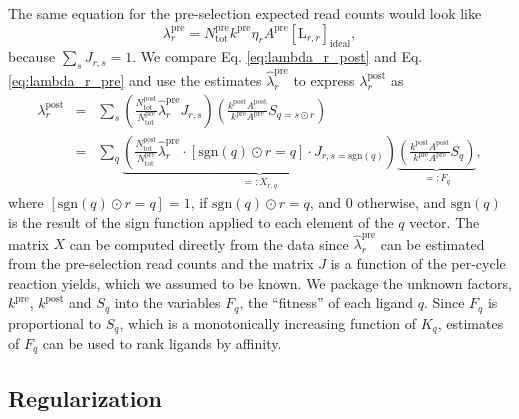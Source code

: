 \documentclass[letter,10pt,oneside]{article}
\newcommand{\bel}{\begin{equation}}
\newcommand{\eel}{\end{equation}}
\newcommand{\bal}{\begin{eqnarray}}
\newcommand{\eal}{\end{eqnarray}}
\newcommand{\+}{^\dagger}
\newcommand{\refeq}[1]{Eq. \ref{#1}}
\begin{document}
The same equation for the pre-selection expected read counts would look like
\bel
\label{eq:lambda_r_pre}
  \lambda_r^\text{pre} = N_\text{tot}^\text{pre} k^\text{pre} \eta_r A^\text{pre}[\text{L}_{r,r}]_\text{ideal},
\eel
because $\sum_s J_{r,s} = 1$. We compare \refeq{eq:lambda_r_post} and \refeq{eq:lambda_r_pre} and use the estimates $\hat \lambda_r^\text{pre}$ to express $\lambda_r^\text{post}$ as
\bal
\label{eq:lambda_post}
  \lambda_r^\text{post} &=& \sum_s \left(\frac{N_\text{tot}^\text{post}}{N_\text{tot}^\text{pre}}\hat\lambda_r^\text{pre} J_{r,s}\right) \left(\frac{k^\text{post}A^\text{post}}{k^\text{pre}A^\text{pre}} S_{q=s\odot r}\right) \\
  &=& \sum_q \underbrace{\left(\frac{N_\text{tot}^\text{post}}{N_\text{tot}^\text{pre}}\hat\lambda_r^\text{pre} \cdot [\text{sgn}(q)\odot r = q]\cdot J_{r,s=\text{sgn}(q)}\right)}_{=:X_{r,q}} \underbrace{\left(\frac{k^\text{post}A^\text{post}}{k^\text{pre}A^\text{pre}} S_{q}\right)}_{=:F_q},
\eal
where $[\text{sgn}(q)\odot r = q] = 1$, if $\text{sgn}(q)\odot r = q$, and $0$ otherwise, and $\text{sgn}(q)$ is the result of the sign function applied to each element of the $q$ vector. The matrix $X$ can be computed directly from the data since $\hat \lambda_r^\text{pre}$ can be estimated from the pre-selection read counts and the matrix $J$ is a function of the per-cycle reaction yields, which we assumed to be known. We package the unknown factors, $k^\text{pre}$, $k^\text{post}$ and $S_q$ into the  variables $F_q$, the ``fitness'' of each ligand $q$. Since $F_q$ is proportional to $S_q$, which is a monotonically increasing function of $K_q$, estimates of $F_q$ can be used to rank ligands by affinity.


\subsection{Regularization}
\end{document}
